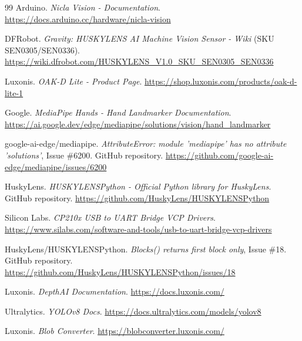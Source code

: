 \documentclass[12pt,a4paper]{report}
\begin{document}
\begin{thebibliography}{99}
		Arduino. \textit{Nicla Vision - Documentation}.
		\url{https://docs.arduino.cc/hardware/nicla-vision}
		
		DFRobot. \textit{Gravity: HUSKYLENS AI Machine Vision Sensor - Wiki} (SKU SEN0305/SEN0336).
		\url{https://wiki.dfrobot.com/HUSKYLENS_V1.0_SKU_SEN0305_SEN0336}
		
		Luxonis. \textit{OAK-D Lite - Product Page}.
		\url{https://shop.luxonis.com/products/oak-d-lite-1}
		
		Google. \textit{MediaPipe Hands - Hand Landmarker Documentation}.
		\url{https://ai.google.dev/edge/mediapipe/solutions/vision/hand_landmarker}
		
		google-ai-edge/mediapipe. \textit{AttributeError: module 'mediapipe' has no attribute 'solutions'}, Issue \#6200. GitHub repository.
		\url{https://github.com/google-ai-edge/mediapipe/issues/6200}
		
		HuskyLens. \textit{HUSKYLENSPython - Official Python library for HuskyLens}. GitHub repository.
		\url{https://github.com/HuskyLens/HUSKYLENSPython}
		
		Silicon Labs. \textit{CP210x USB to UART Bridge VCP Drivers}.
		\url{https://www.silabs.com/software-and-tools/usb-to-uart-bridge-vcp-drivers}
		
		HuskyLens/HUSKYLENSPython. \textit{Blocks() returns first block only}, Issue \#18. GitHub repository.
		\url{https://github.com/HuskyLens/HUSKYLENSPython/issues/18}
		
		Luxonis. \textit{DepthAI Documentation}.
		\url{https://docs.luxonis.com/}
		
		Ultralytics. \textit{YOLOv8 Docs}.
		\url{https://docs.ultralytics.com/models/yolov8}
		
		Luxonis. \textit{Blob Converter}.
		\url{https://blobconverter.luxonis.com/}
		
	\end{thebibliography}
\end{document}
